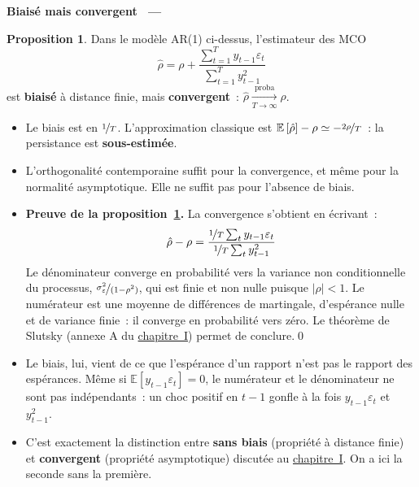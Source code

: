 \documentclass[10pt,a4paper]{article}
\makeatletter
\newcommand{\siteurl}{https://le-mans.adjemian.eu/econometrics}
\newcommand{\chapref}[2]{\href{\siteurl/chapitre-#1.pdf}{chapitre~#2}}
\newcommand{\plim}{\xrightarrow[T\rightarrow\infty]{\text{proba}}}
\newcommand{\epsvar}{\sigma_{\varepsilon}^2}
\theoremstyle{definition}
\newtheorem{prop}{Proposition}
\renewcommand{\newline}{\unskip\par\vspace{1.5pt}}
\newenvironment{frame}[1][]{\par}{\par}
\newcommand{\frameheadrule}{%
  \par\nobreak\vspace{1pt}{\color{ctitle}\hrule height 0.6pt}\nobreak\vspace{4pt}}
\newcommand{\frametitle}[1]{%
  \par\addvspace{8pt plus 2pt}\needspace{6\baselineskip}%
  \noindent\begingroup\color{ctitle}\sffamily\bfseries\large #1\endgroup
  \@ifnextchar\framesubtitle{}{\frameheadrule}}
\newcommand{\framesubtitle}[1]{%
  \begingroup\color{ctitle}\sffamily\normalsize\ --- #1\endgroup\frameheadrule}
\makeatother
\begin{document}
\begin{frame}
  \frametitle{Biaisé mais convergent}

  \begin{prop}\label{prop:ar1}
    Dans le modèle AR(1) ci-dessus, l'estimateur des MCO
    \[
      \hat\rho = \rho + \frac{\sum_{t=1}^T y_{t-1}\varepsilon_t}{\sum_{t=1}^T y_{t-1}^2}
    \]
    est \textbf{biaisé} à distance finie, mais \textbf{convergent}~:
    $\hat\rho\plim\rho$.
  \end{prop}

  \bigskip

  \begin{itemize}

  \item Le biais est en $\nicefrac{1}{T}$. L'approximation classique
    est $\mathbb E\left[ \hat\rho \right]-\rho \simeq -\nicefrac{2\rho}{T}$~: la
    persistance est \textbf{sous-estimée}.\newline

  \item L'orthogonalité contemporaine suffit pour la convergence, et même pour la
    normalité asymptotique. Elle ne suffit pas pour l'absence de biais.

  \end{itemize}

\end{frame}


\begin{notes}

  \begin{itemize}

  \item \textbf{Preuve de la proposition~\ref{prop:ar1}.} La convergence
    s'obtient en écrivant~:
    \[
      \hat\rho - \rho = \frac{\nicefrac{1}{T}\sum_t y_{t-1}\varepsilon_t}{\nicefrac{1}{T}\sum_t y_{t-1}^2}
    \]
    Le dénominateur converge en probabilité vers la variance non conditionnelle
    du processus, $\nicefrac{\epsvar}{(1-\rho^2)}$, qui est finie et non nulle
    puisque $|\rho|<1$. Le numérateur est une moyenne de différences de
    martingale, d'espérance nulle et de variance finie~: il converge en
    probabilité vers zéro. Le théorème de Slutsky (annexe A du \chapref{1}{I})
    permet de conclure.\qed\newline

  \item Le biais, lui, vient de ce que l'espérance d'un rapport n'est pas le
    rapport des espérances. Même si $\mathbb E[y_{t-1}\varepsilon_t]=0$, le
    numérateur et le dénominateur ne sont pas indépendants~: un choc positif
    en $t-1$ gonfle à la fois $y_{t-1}\varepsilon_t$ et $y_{t-1}^2$.\newline

  \item C'est exactement la distinction entre \textbf{sans biais} (propriété à
    distance finie) et \textbf{convergent} (propriété asymptotique) discutée au
    \chapref{1}{I}. On a ici la seconde sans la première.

  \end{itemize}

\end{notes}
\end{document}
